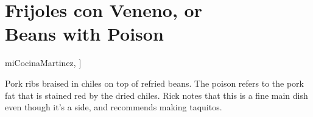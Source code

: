 \section[Frijoles con Veneno]{Frijoles con Veneno, or\\Beans with Poison}

\begin{recipestats}[
        servings=6,
        preptime=1 \hour,
        bakingtime=3 \hour,
        original=\citeauthor{miCocinaMartinez}~\cite[p.208]{miCocinaMartinez},
    ]
\end{recipestats}

\begin{recipeabstract}
    Pork ribs braised in chiles on top of refried beans.
    The poison refers to the pork fat that is stained red by the dried chiles.
    Rick notes that this is a fine main dish even though it's a side, and recommends making taquitos.
\end{recipeabstract}

\begin{ingredientcolumns}
    \begin{ingredientblock}
        \\
        \\
        \\
        \\
        \\
    \end{ingredientblock}

    \begin{ingredientblock}
        \\
        \\
        \\
        \\
        \\
    \end{ingredientblock}
\end{ingredientcolumns}

